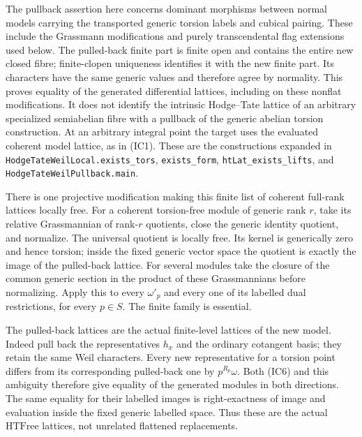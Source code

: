 The pullback assertion here concerns dominant morphisms
between normal models carrying the transported generic
torsion labels and cubical pairing. These include the
Grassmann modifications and purely transcendental flag
extensions used below. The pulled-back finite part is
finite open and contains the entire new closed fibre;
finite-clopen uniqueness identifies it with the new
finite part. Its characters have the same generic
values and therefore agree by normality.
This proves equality of the generated differential
lattices, including on these nonflat modifications.
It does not identify the intrinsic Hodge--Tate lattice
of an arbitrary specialized semiabelian fibre with
a pullback of the generic abelian torsion construction.
At an arbitrary integral point the target uses the
evaluated coherent model lattice, as in (IC1).
These are the constructions expanded in
\texttt{HodgeTateWeilLocal.exists\_tors},
\texttt{exists\_form}, \texttt{htLat\_exists\_lifts},
and \texttt{HodgeTateWeilPullback.main}.

There is one projective modification making this
finite list of coherent full-rank lattices locally free.
For a coherent torsion-free module of generic rank \(r\),
take its relative Grassmannian of rank-\(r\) quotients,
close the generic identity quotient, and normalize.
The universal quotient is locally free.
Its kernel is generically zero and hence torsion;
inside the fixed generic vector space the quotient
is exactly the image of the pulled-back lattice.
For several modules take the closure of the common
generic section in the product of these Grassmannians
before normalizing.
Apply this to every \(\omega'_p\) and every one of
its labelled dual restrictions, for every \(p\in S\).
The finite family is essential.

The pulled-back lattices are the actual finite-level
lattices of the new model.
Indeed pull back the representatives \(h_x\) and the
ordinary cotangent basis; they retain the same Weil
characters. Every new representative for a torsion
point differs from its corresponding pulled-back one
by \(p^{R_p}\omega\).
Both (IC6) and this ambiguity therefore give equality
of the generated modules in both directions.
The same equality for their labelled images is
right-exactness of image and evaluation inside
the fixed generic labelled space.
Thus these are the actual \(\mathrm{HTFree}\)
lattices, not unrelated flattened replacements.

